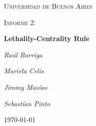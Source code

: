 \documentclass[11pt, spanish]{article}
\begin{document}
\begin{titlepage}
    \centering
    {\scshape\LARGE Universidad de Buenos Aires \par}
    \vspace{1cm}
    {\scshape\Large Informe 2:\par}

    \vspace{1.5cm}
    {\scshape\Large\par}
    {\huge\bfseries  Lethalily-Centrality Rule\par}
    \vspace{2cm}
    {\Large\itshape Ra\'ul Barriga\par}
    {\Large\itshape Mariela Celis\par}
    {\Large\itshape Jimmy Mas\'ias\par}
    {\Large\itshape Sebast\'ian Pinto\par}

    \vfill

    \vfill

    {\large \today\par}
\end{titlepage}

    \tableofcontents

    





\end{document}
